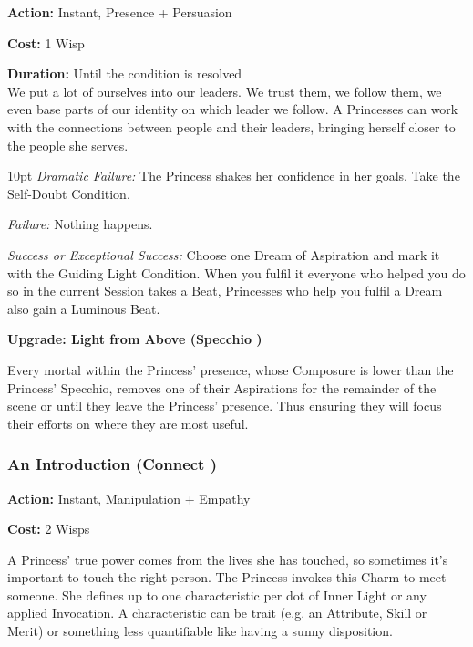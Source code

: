 \noindent \textbf{Action:} Instant, Presence + Persuasion

\noindent \textbf{Cost:} 1 Wisp

\noindent \textbf{Duration:} Until the condition is resolved \\

\noindent We put a lot of ourselves into our leaders. We trust them, we follow them, we even base parts of our identity on which leader we follow. A Princesses can work with the connections between people and their leaders, bringing herself closer to the people she serves. 

\begin{myindentpar}{10pt}
    \emph{Dramatic Failure:} The Princess shakes her confidence in her goals. Take the Self-Doubt Condition. 
    
    \emph{Failure:} Nothing happens. 
    
    \emph{Success or Exceptional Success:} Choose one Dream of Aspiration and mark it with the Guiding Light Condition. When you fulfil it everyone who helped you do so in the current Session takes a Beat, Princesses who help you fulfil a Dream also gain a Luminous Beat. 
	
	 \textbf{Upgrade: Light from Above (Specchio \textbullet\textbullet\textbullet)}
    
     Every mortal within the Princess' presence, whose Composure is lower than the Princess' Specchio, removes one of their Aspirations for the remainder of the scene or until they leave the Princess' presence. Thus ensuring they will focus their efforts on where they are most useful. 
    
\end{myindentpar}

\subsubsection*{An Introduction (Connect \textbullet\textbullet\textbullet)}

\noindent \textbf{Action:} Instant, Manipulation + Empathy

\noindent \textbf{Cost:} 2 Wisps

\noindent A Princess' true power comes from the lives she has touched, so sometimes it's important to touch the right person. The Princess invokes this Charm to meet someone. She defines up to one characteristic per dot of Inner Light or any applied Invocation. A characteristic can be trait (e.g. an Attribute, Skill or Merit) or something less quantifiable like having a sunny disposition. 

